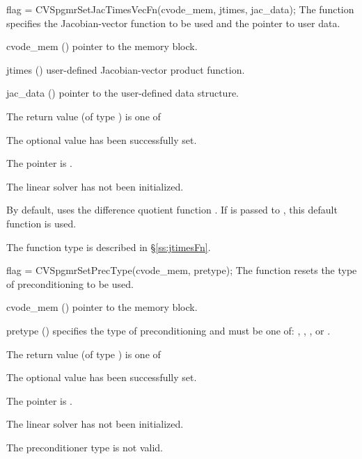 {
  flag = CVSpgmrSetJacTimesVecFn(cvode\_mem, jtimes, jac\_data);
}
{
  The function  specifies the Jacobian-vector 
  function to be used and the pointer to user data.
}
{
  \begin{args}
  \item[cvode\_mem] ()
    pointer to the {\cvode} memory block.
  \item[jtimes] ()
    user-defined Jacobian-vector product function.
  \item[jac\_data] ()
     pointer to the user-defined data structure.
  \end{args}
}
{
  The return value  (of type ) is one of
  \begin{args}
  \item[\Id{CVSPGMR\_SUCCESS}] 
    The optional value has been successfully set.
  \item[\Id{CVSPGMR\_MEM\_NULL}]
    The  pointer is .
  \item[\Id{CVSPGMR\_LMEM\_NULL}]
    The {\cvspgmr} linear solver has not been initialized.
  \end{args}
}
{
  By default, {\cvspgmr} uses the difference quotient function .
  If  is passed to , this default function is used.

  The function type  is described in \S\ref{ss:jtimesFn}.
}
{
  flag = CVSpgmrSetPrecType(cvode\_mem, pretype);
}
{
  The function  resets the type
  of preconditioning to be used.
}
{
  \begin{args}
  \item[cvode\_mem] ()
    pointer to the {\cvode} memory block.
  \item[pretype] ()
    specifies the type of preconditioning and must be one of:
    , , , or .
  \end{args}
}
{
  The return value  (of type ) is one of
  \begin{args}
  \item[\Id{CVSPGMR\_SUCCESS}] 
    The optional value has been successfully set.
  \item[\Id{CVSPGMR\_MEM\_NULL}]
    The  pointer is .
  \item[\Id{CVSPGMR\_LMEM\_NULL}]
    The {\cvspgmr} linear solver has not been initialized.
  \item[\Id{CVSPGMR\_ILL\_INPUT}]
    The preconditioner type  is not valid.
  \end{args}
}
